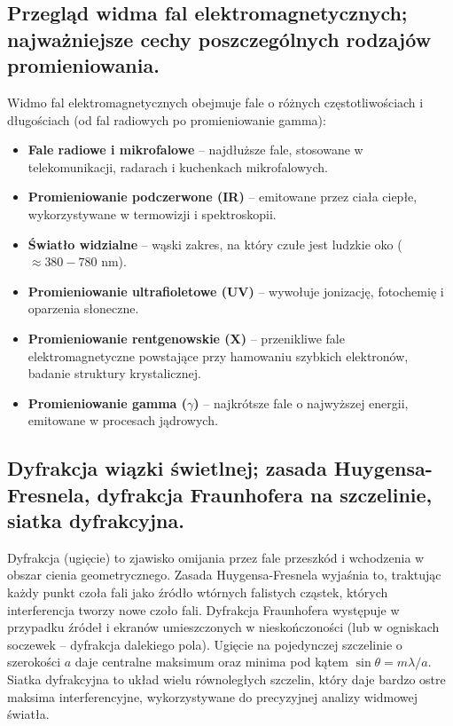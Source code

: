 \documentclass[11pt,a4paper]{article}
\begin{document}
\subsection{Przegląd widma fal elektromagnetycznych; najważniejsze cechy poszczególnych rodzajów promieniowania.}
Widmo fal elektromagnetycznych obejmuje fale o różnych częstotliwościach i długościach (od fal radiowych po promieniowanie gamma):
\begin{itemize}
    \item \textbf{Fale radiowe i mikrofalowe} -- najdłuższe fale, stosowane w telekomunikacji, radarach i kuchenkach mikrofalowych.
    \item \textbf{Promieniowanie podczerwone (IR)} -- emitowane przez ciała ciepłe, wykorzystywane w termowizji i spektroskopii.
    \item \textbf{Światło widzialne} -- wąski zakres, na który czułe jest ludzkie oko ($\approx 380-780$ nm).
    \item \textbf{Promieniowanie ultrafioletowe (UV)} -- wywołuje jonizację, fotochemię i oparzenia słoneczne.
    \item \textbf{Promieniowanie rentgenowskie (X)} -- przenikliwe fale elektromagnetyczne powstające przy hamowaniu szybkich elektronów, badanie struktury krystalicznej.
    \item \textbf{Promieniowanie gamma ($\gamma$)} -- najkrótsze fale o najwyższej energii, emitowane w procesach jądrowych.
\end{itemize}

\subsection{Dyfrakcja wiązki świetlnej; zasada Huygensa-Fresnela, dyfrakcja Fraunhofera na szczelinie, siatka dyfrakcyjna.}
Dyfrakcja (ugięcie) to zjawisko omijania przez fale przeszkód i wchodzenia w obszar cienia geometrycznego. Zasada Huygensa-Fresnela wyjaśnia to, traktując każdy punkt czoła fali jako źródło wtórnych falistych cząstek, których interferencja tworzy nowe czoło fali. Dyfrakcja Fraunhofera występuje w przypadku źródeł i ekranów umieszczonych w nieskończoności (lub w ogniskach soczewek -- dyfrakcja dalekiego pola). Ugięcie na pojedynczej szczelinie o szerokości $a$ daje centralne maksimum oraz minima pod kątem $\sin\theta = m\lambda/a$. Siatka dyfrakcyjna to układ wielu równoległych szczelin, który daje bardzo ostre maksima interferencyjne, wykorzystywane do precyzyjnej analizy widmowej światła.
\end{document}
